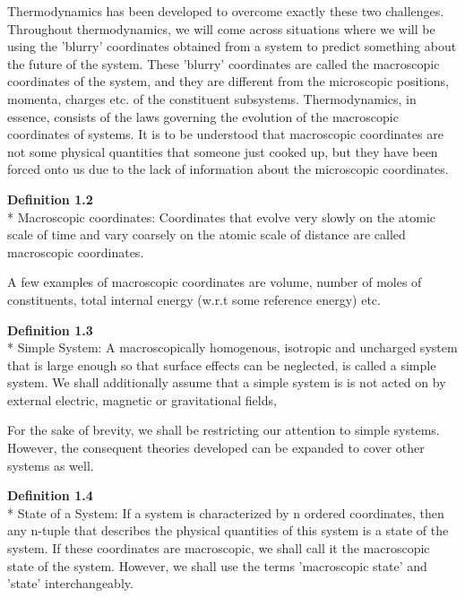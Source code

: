 \documentclass[oneside]{book}
\begin{document}
Thermodynamics has been developed to overcome exactly these two challenges. Throughout thermodynamics, we will come across situations where we will be using the 'blurry' coordinates obtained from a system to predict something about the future of the system. These 'blurry' coordinates are called the macroscopic coordinates of the system, and they are different from the microscopic positions, momenta, charges etc. of the constituent subsystems. Thermodynamics, in essence, consists of the laws governing the evolution of the macroscopic coordinates of systems. It is to be understood that macroscopic coordinates are not some physical quantities that someone just cooked up, but they have been forced onto us due to the lack of information about the microscopic coordinates.\\

\begin{mdframed}[style=exercise]
\textbf{Definition 1.2}
\\* Macroscopic coordinates: Coordinates that evolve very slowly on the atomic scale of time and vary coarsely on the atomic scale of distance are called macroscopic coordinates. \\ 
\end{mdframed}

A few examples of macroscopic coordinates are volume, number of moles of constituents, total internal energy (w.r.t some reference energy) etc.\\

\begin{mdframed}[style=exercise]
\textbf{Definition 1.3}
\\* Simple System: A macroscopically homogenous, isotropic and uncharged system that is large enough so that surface effects can be neglected, is called a simple system. We shall additionally assume that a simple system is is not acted on by external electric, magnetic or gravitational fields, \\ 
\end{mdframed}

For the sake of brevity, we shall be restricting our attention to simple systems. However, the consequent theories developed can be expanded to cover other systems as well.\\

\begin{mdframed}[style=exercise]
\textbf{Definition 1.4}
\\* State of a System: If a system is characterized by n ordered coordinates, then any n-tuple that describes the physical quantities of this system is a state of the system. If these coordinates are macroscopic, we shall call it the macroscopic state of the system. However, we shall use the terms 'macroscopic state' and 'state' interchangeably.\\ 
\end{mdframed}
\end{document}

